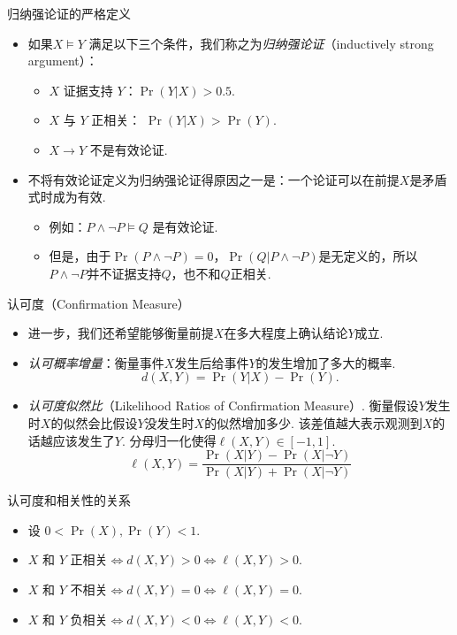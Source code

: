 	{归纳强论证的严格定义}
	\begin{itemize}
	    \item 如果$X \models Y$ 满足以下三个条件，我们称之为\emph{归纳强论证}（inductively strong argument）：
	\begin{itemize}
	\item $X$ 证据支持 $Y$：$\Pr(Y|X)>0.5$.
	\item $X$ 与 $Y$ 正相关： $\Pr(Y|X) > \Pr(Y)$. 
	\item $X\rightarrow Y$ 不是有效论证.
	\end{itemize}
	 \item 不将有效论证定义为归纳强论证得原因之一是：一个论证可以在前提$X$是矛盾式时成为有效.
    \begin{itemize}
            \item 例如：$P \wedge \neg P \models Q$ 是有效论证.
            \item 但是，由于$\Pr(P \wedge \neg P) = 0$，$\Pr(Q | P \wedge \neg P)$是无定义的，所以$P \wedge \neg P$并不证据支持$Q$，也不和$Q$正相关.
        \end{itemize}	

	\end{itemize}


{认可度（Confirmation Measure）}
    \begin{itemize}
    \item     进一步，我们还希望能够衡量前提$X$在多大程度上确认结论$Y$成立.
    \item \emph{认可概率增量}：衡量事件$X$发生后给事件$Y$的发生增加了多大的概率.
        \[
            d(X, Y) = \Pr(Y|X) - \Pr(Y).
        \]
        \item \emph{认可度似然比}（Likelihood Ratios of Confirmation Measure）.
        衡量假设$Y$发生时$X$的似然会比假设$Y$没发生时$X$的似然增加多少.
        该差值越大表示观测到$X$的话越应该发生了$Y$. 分母归一化使得$\ell(X,Y)\in[-1,1]$.
        \[
            \ell(X, Y) = \frac{\Pr(X|Y) - \Pr(X|\lnot Y)}{\Pr(X|Y) + \Pr(X|\lnot Y)}
        \]
    \end{itemize} 


{认可度和相关性的关系}
\begin{itemize}
    \item 设 $0< \Pr(X),\Pr(Y) < 1$.
    \item $X$ 和 $Y$ 正相关$\iff d(X,Y) > 0\iff \ell(X, Y) > 0$.
    \item $X$ 和 $Y$ 不相关$\iff d(X, Y) = 0\iff \ell(X, Y) = 0$. 
    \item $X$ 和 $Y$ 负相关$\iff d(X,Y) < 0\iff\ell(X, Y) < 0$.
\end{itemize}


